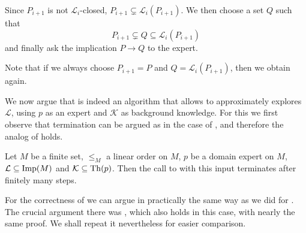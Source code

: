 Since $P_{i+1}$ is not $\mathcal{L}_{i}$-closed, $P_{i+1} \subsetneq
\mathcal{L}_{i}(P_{i+1})$.  We then choose a set $Q$ such that
\begin{equation*}
  P_{i+1} \subsetneq Q \subseteq \mathcal{L}_{i}(P_{i+1})
\end{equation*}
and finally ask the implication $P \to Q$ to the expert.

Note that if we always choose $P_{i+1} = P$ and $Q = \mathcal{L}_{i}(P_{i+1})$, then we
obtain  again.

We now argue that  is indeed an algorithm
that allows to approximately explores $\mathcal{L}$, using $p$ as an expert and
$\mathcal{K}$ as background knowledge.  For this we first observe that termination can be
argued as in the case of , and therefore the analog of
 holds.

\begin{Theorem}
  \label{thm:explore-implications-weaker-version-termination}
  Let $M$ be a finite set, $\leq_{M}$ a linear order on $M$, $p$ be a domain expert on
  $M$, $\mathcal{L} \subseteq \operatorname{Imp}(M)$ and $\mathcal{K} \subseteq \operatorname{Th}(p)$.  Then the call
  to  with this input terminates after
  finitely many steps.
\end{Theorem}

For the correctness of  we can argue in
practically the same way as we did for .  The crucial
argument there was , which also holds
in this case, with nearly the same proof.  We shall repeat it nevertheless for easier
comparison.


